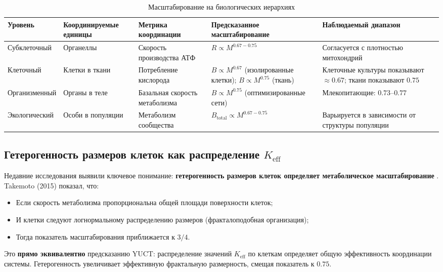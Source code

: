 \documentclass[12pt]{article}
\newcommand{\Keff}{K_{\mathrm{eff}}}
\begin{document}
	\begin{table}[htbp]
		\centering
		\caption{Масштабирование на биологических иерархиях}
		\label{tab:hierarchical-scaling}
		\begin{tabular}{p{3cm} p{3cm} p{3.5cm} p{2.5cm} p{3cm}}
			\toprule
			\textbf{Уровень} & \textbf{Координируемые единицы} & \textbf{Метрика координации} & \textbf{Предсказанное масштабирование} & \textbf{Наблюдаемый диапазон} \\
			\midrule
			Субклеточный & Органеллы & Скорость производства АТФ & \(R \propto M^{0.67-0.75}\) & Согласуется с плотностью митохондрий \cite{West2002} \\
			Клеточный & Клетки в ткани & Потребление кислорода & \(B \propto M^{0.67}\) (изолированные клетки); \(B \propto M^{0.75}\) (ткань) & Клеточные культуры показывают \(\approx 0.67\); ткани показывают \(0.75\) \cite{West2002} \\
			Организменный & Органы в теле & Базальная скорость метаболизма & \(B \propto M^{0.75}\) (оптимизированные сети) & Млекопитающие: \(0.73\)–\(0.77\) \cite{Kleiber1932} \\
			Экологический & Особи в популяции & Метаболизм сообщества & \(B_{\text{total}} \propto M^{0.67-0.75}\) & Варьируется в зависимости от структуры популяции \cite{Glazier2005} \\
			\bottomrule
		\end{tabular}
	\end{table}
	
	\subsection{Гетерогенность размеров клеток как распределение \(\Keff\)}
	
	Недавние исследования выявили ключевое понимание: \textbf{гетерогенность размеров клеток определяет метаболическое масштабирование} \cite{Takemoto2015}. Takemoto (2015) показал, что:
	\begin{itemize}
		\item Если скорость метаболизма пропорциональна общей площади поверхности клеток;
		\item И клетки следуют логнормальному распределению размеров (фракталоподобная организация);
		\item Тогда показатель масштабирования приближается к \(3/4\).
	\end{itemize}
	Это \textbf{прямо эквивалентно} предсказанию YUCT: распределение значений \(\Keff\) по клеткам определяет общую эффективность координации системы. Гетерогенность увеличивает эффективную фрактальную размерность, смещая показатель к \(0.75\).
	
\end{document}
